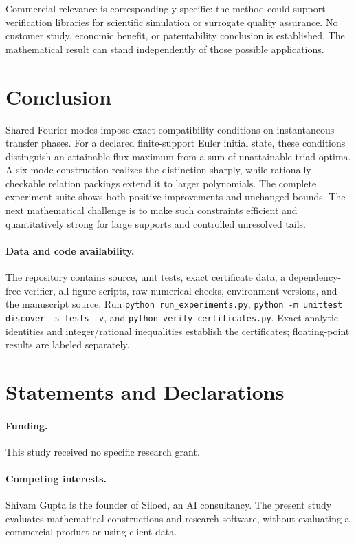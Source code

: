 \documentclass[11pt]{article}
\begin{document}
Commercial relevance is correspondingly specific: the method could support verification libraries for scientific simulation or surrogate quality assurance. No customer study, economic benefit, or patentability conclusion is established. The mathematical result can stand independently of those possible applications.

\section{Conclusion}
Shared Fourier modes impose exact compatibility conditions on instantaneous transfer phases. For a declared finite-support Euler initial state, these conditions distinguish an attainable flux maximum from a sum of unattainable triad optima. A six-mode construction realizes the distinction sharply, while rationally checkable relation packings extend it to larger polynomials. The complete experiment suite shows both positive improvements and unchanged bounds. The next mathematical challenge is to make such constraints efficient and quantitatively strong for large supports and controlled unresolved tails.

\paragraph{Data and code availability.}
The repository contains source, unit tests, exact certificate data, a dependency-free verifier, all figure scripts, raw numerical checks, environment versions, and the manuscript source. Run \texttt{python run\_experiments.py}, \texttt{python -m unittest discover -s tests -v}, and \texttt{python verify\_certificates.py}. Exact analytic identities and integer/rational inequalities establish the certificates; floating-point results are labeled separately.

\section*{Statements and Declarations}
\paragraph{Funding.} This study received no specific research grant.
\paragraph{Competing interests.} Shivam Gupta is the founder of Siloed, an AI consultancy. The present study evaluates mathematical constructions and research software, without evaluating a commercial product or using client data.
\end{document}
